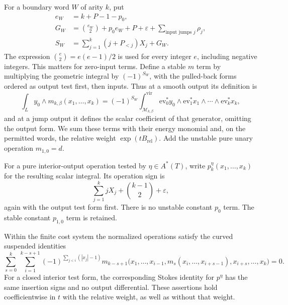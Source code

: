 For a boundary word $W$ of arity $k$, put
\begin{equation}
 \label{obs:normalization}
 \begin{split}
 e_W&=k+P-1-p_0,\\
 G_W&=\binom{e_W}{2}+p_0e_W+P+\varepsilon
                  +\sum_{\text{input jumps }j}\rho_j,\\
 S_W&=\sum_{j=1}^k(j+P_{<j})X_j+G_W.
 \end{split}
\end{equation}
The expression $\binom e2=e(e-1)/2$ is used for every integer $e$,
including negative integers.  This matters for zero-input terms.
Define a stable $m$ term by multiplying the geometric integral by
$(-1)^{S_W}$, with the pulled-back forms ordered as output test
first, then inputs.  Thus at a smooth output its definition is
\[
 \int_L y_0\wedge m_{k,\beta}(x_1,\ldots,x_k)
 =(-1)^{S_W}
   \int_{\mathcal M_{k,\beta}}^{\mathrm{vir}}
          \mathrm{ev}_0^*y_0\wedge
          \mathrm{ev}_1^*x_1\wedge\cdots\wedge
          \mathrm{ev}_k^*x_k,
\]
and at a jump output it defines the scalar coefficient of that
generator, omitting the output form.  We sum these terms with their
energy monomial and, on the permitted words, the relative weight
$\exp(tB_{\mathrm{rel}})$.  Add the unstable pure unary operation
$m_{1,0}=d$.

For a pure interior-output operation tested by $\eta\in A^*(T)$,
write $p_k^\eta(x_1,\ldots,x_k)$ for the resulting scalar integral.
Its operation sign is
\begin{equation}
 \label{obs:p-normalization}
 \sum_{j=1}^k jX_j+\binom{k-1}{2}+\varepsilon,
\end{equation}
again with the output test form first.  There is no unstable
constant $p_0$ term.  The stable constant $p_{1,0}$ term is retained.

\begin{proposition}\label{obs:ainfinity}
Within the finite cost system the normalized operations satisfy
the curved suspended identities
\begin{equation}
 \label{obs:ainfinity-equation}
 \sum_{s=0}^k\ \sum_{i=1}^{k-s+1}
 (-1)^{\sum_{j<i}(|x_j|-1)}
 m_{k-s+1}\bigl(x_1,\ldots,x_{i-1},
       m_s(x_i,\ldots,x_{i+s-1}),
       x_{i+s},\ldots,x_k\bigr)=0.
\end{equation}
For a closed interior test form, the corresponding Stokes identity
for $p^\eta$ has the same insertion signs and no output
differential.  These assertions hold coefficientwise in $t$ with
the relative weight, as well as without that weight.
\end{proposition}

